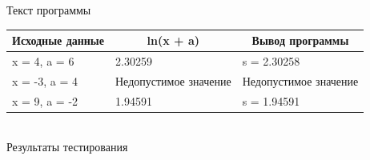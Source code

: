 \documentclass[a4paper,14pt]{extarticle}
\begin{document}

\begin{center}
Текст программы
\end{center}
\begin{center}
\begin{tabular}{|l|l|l|}
\hline
\multicolumn{1}{|c|}{Исходные данные}&\multicolumn{1}{|c|}{ln(x + a)}& \multicolumn{1}{|c|}{Вывод программы}\\
\hline
x = 4, a = 6 & 2.30259 & s = 2.30258\\
x = -3, a = 4 & Недопустимое значение & Недопустимое значение\\
x = 9, a = -2 & 1.94591 & s = 1.94591\\
\hline
\end{tabular}\\
\vspace{0.3cm}
Результаты тестирования
\end{center}
\end{document}
